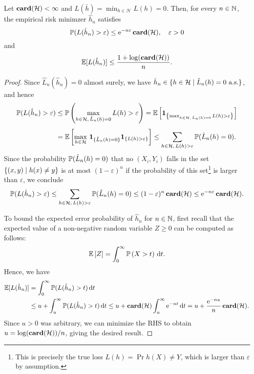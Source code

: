 \begin{theorem}
Let $\card{\mathcal{H}} < \infty$ and $L(\bar h) = \min_{h \in \mathcal{H}} L(h) = 0$. Then, for every $n \in \N$, the empirical risk minimzer $\hat h_n$ satisfies
\[
    \P(L(\hat h_n) > \varepsilon) \leq \e^{-n \varepsilon} \, \card{\mathcal{H}}, \quad \varepsilon > 0
\]
and
\[
    \ex{L(\hat h_n)} \leq \frac{1 + \log(\card{\mathcal{H}})}{n}.
\]
\end{theorem}

\begin{proof}
Since $\hat L_n(\hat h_n) = 0$ almost surely, we have $\hat h_n \in \{h \in \mathcal{H} \with \hat L_n(h) = 0 \text{ a.s.}\}$, and hence
\begin{align*}
    \P(L(\hat h_n) > \varepsilon) &\leq \Pr{\max_{h \in \mathcal{H},\,\hat L_n(h) = 0} L(h) > \varepsilon} = \Ex{\indSet{\max_{h \in \mathcal{H},\,\hat L_n(h) = 0} L(h) > \varepsilon}} \\[4pt]
        &=\Ex{\max_{h\in\mathcal{H}}\, \mathbf{1}_{\{\hat L_n(h) = 0\}} \indSet{L(h) > \varepsilon}} \leq \sum_{h\in\mathcal{H},\,L(h) > \varepsilon} \P(\hat L_n(h) = 0).
\end{align*}
Since the probability $\P(\hat L_n(h) = 0)$ that no $(X_i, Y_i)$ falls in the set $\set{(x, y) \with h(x) \neq y}$ is at most $(1 - \varepsilon)^n$ if the probability of this set\footnote{This is precisely the true loss $L(h) = \Pr{h(X) \neq Y}$, which is larger than $\varepsilon$ by assumption.} is larger than $\varepsilon$, we conclude
\[
    \P(L(\hat h_n) > \varepsilon) \leq \sum_{h\in\mathcal{H}, \, L(h) > \varepsilon} \P(\hat L_n(h) = 0) \leq (1 - \varepsilon)^n \, \card{\mathcal{H}} \leq \e^{-n \varepsilon} \, \card{\mathcal{H}}.
\]

To bound the expected error probability of $\hat h_n$ for $n \in \N$, first recall that the expected value of a non-negative random variable $Z \geq 0$ can be computed as follows:
\[
    \Ex{Z} = \int_0^\infty \Pr{X > t} \dt.
\]
Hence, we have
\begin{align*}
    \ex{L(\hat h_n)} &= \int_0^\infty \P(L(\hat h_n) > t) \dt \\
        &\leq u + \int_u^\infty \P(L(\hat h_n) > t) \dt \leq u + \card{\mathcal{H}} \int_u^\infty \e^{-nt} \dt = u + \frac{\e^{-nu}}{n} \, \card{\mathcal{H}}.
\end{align*}
Since $u > 0$ was arbitrary, we can minimize the RHS to obtain $u = \log(\card{\mathcal{H}}) / n$, giving the desired result.
\end{proof}
